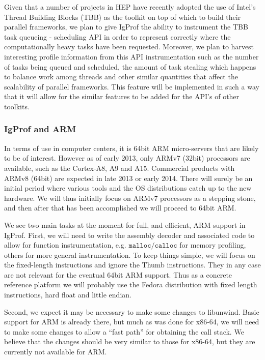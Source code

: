 \documentclass[notitlepage,letter,12pt]{article}
\begin{document}
Given that a number of projects in HEP have recently adopted the use of 
Intel's Thread Building Blocks (TBB) as the toolkit on top of which to build
their parallel frameworks, we plan to give IgProf the ability to
instrument the TBB task queueing - scheduling API in order to represent
correctly where the computationally heavy tasks have been requested. 
Moreover, we plan to harvest interesting profile information from this API
instrumentation such as the number of tasks being queued and
scheduled, the amount of task stealing which happens to balance
work among threads and other similar quantities that affect the
scalability of parallel frameworks. This feature will be implemented
in such a way that it will allow for the similar features to be added
for the API's of other toolkits.


\subsubsection{IgProf and ARM}

In terms of use in computer centers, it is 64bit ARM micro-servers that
are likely to be of interest. However as of early 2013, only ARMv7 (32bit) 
processors are available, such as the Cortex-A8, A9 and A15. Commercial
products with ARMv8 (64bit) are expected in late 2013 or early 2014. There will surely
be an initial period where various tools and the OS distributions catch up 
to the new hardware. We will thus initially focus on ARMv7 processors as
a stepping stone, and then after that has been accomplished we will proceed
to 64bit ARM.

We see two main tasks at the moment for full, and efficient, ARM support
in IgProf. First, we will need to write the assembly decoder and associated
code to allow for function instrumentation, e.g. $\texttt{malloc/calloc}$ for
memory profiling, others for more general instrumentation. To keep things
simple, we will focus on the fixed-length instructions and ignore the
Thumb instructions. They in any case are not relevant for the eventual
64bit ARM support. Thus as a concrete reference platform we will probably
use the Fedora distribution with fixed length instructions, hard float and 
little endian.

Second, we expect it may be necessary to make some changes to libunwind.
Basic support for ARM is already there, but much as was done for x86-64, we
will need to make some changes to allow a ``fast path'' for obtaining the
call stack. We believe that the changes should be very similar to those for
x86-64, but they are currently not available for ARM.
\end{document}
